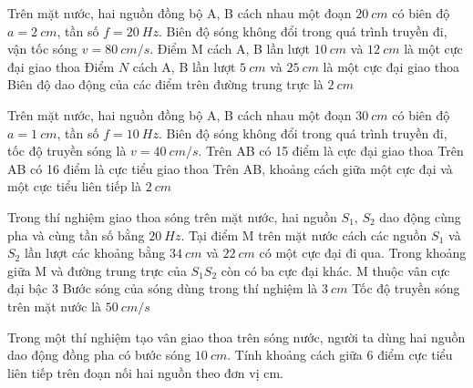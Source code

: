 \begin{ex}
Trên mặt nước, hai nguồn đồng bộ A, B cách nhau một đoạn $20 \ cm$ có biên độ $a=2 \ cm$, tần số $f=20 \ Hz$. Biên độ sóng không đổi trong quá trình truyền đi, vận tốc sóng $v=80 \ cm/s$.
{Điểm M cách A, B lần lượt $10 \ cm$ và $12 \ cm$ là một cực đại giao thoa}
{\True Điểm $N$ cách A, B lần lượt $5 \ cm$ và $25 \ cm$ là một cực đại giao thoa}
{Biên độ dao động của các điểm trên đường trung trực là $2 \ cm$}
\loigiai{
\begin{itemchoice}
\itemch
\itemch
\itemch
\itemch
\end{itemchoice}
}
\end{ex} 
\begin{ex}
Trên mặt nước, hai nguồn đồng bộ A, B cách nhau một đoạn $30 \ cm$ có biên độ $a=1 \ cm$, tần số $f=10 \ Hz$. Biên độ sóng không đổi trong quá trình truyền đi, tốc độ truyền sóng là $v=40 \ cm/s$.
{\True Trên AB có 15 điểm là cực đại giao thoa}
{Trên AB có 16 điểm là cực tiểu giao thoa}
{Trên AB, khoảng cách giữa một cực đại và một cực tiểu liên tiếp là $2 \ cm$}
\loigiai{
\begin{itemchoice}
\itemch
\itemch
\itemch
\itemch
\end{itemchoice}
}
\end{ex} 
\begin{ex}
Trong thí nghiệm giao thoa sóng trên mặt nước, hai nguồn $S_1$, $S_2$ dao động cùng pha và cùng tần số bằng $20\ Hz$. Tại điểm M trên mặt nước cách các nguồn $S_1$ và $S_2$ lần lượt các khoảng bằng $34\ cm$ và $22\ cm$ có một cực đại đi qua. Trong khoảng giữa M và đường trung trực của $S_1S_2$ còn có ba cực đại khác.
{M thuộc vân cực đại bậc 3}
{\True Bước sóng của sóng dùng trong thí nghiệm là $3\ cm$}
{Tốc độ truyền sóng trên mặt nước là $50\ cm/s$}
\loigiai{
\begin{itemchoice}
\itemch
\itemch
\itemch
\itemch
\end{itemchoice}
}
\end{ex}
\PhanIII
\setcounter{ex}{0}
\begin{ex}
Trong một thí nghiệm tạo vân giao thoa trên sóng nước, người ta dùng hai nguồn dao động đồng pha có bước sóng $10 \ cm$. Tính khoảng cách giữa 6 điểm cực tiểu liên tiếp trên đoạn nối hai nguồn theo đơn vị cm.\\
\end{ex} 

